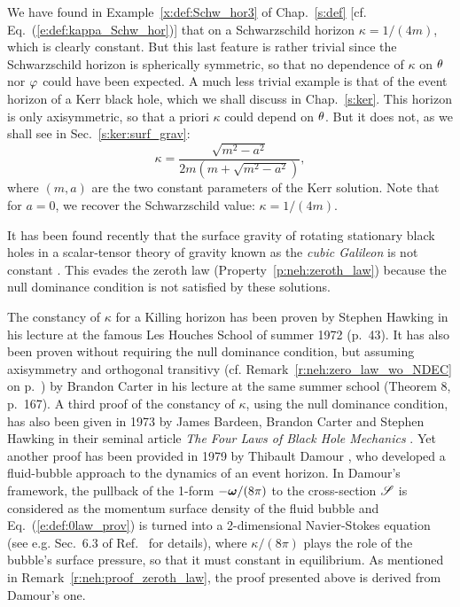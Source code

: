 \begin{example}
\label{x:neh:Schw_Kerr_kappa}
We have found in Example~\ref{x:def:Schw_hor3} of Chap.~\ref{s:def} [cf. Eq.~(\ref{e:def:kappa_Schw_hor})]
that on a Schwarzschild horizon $\kappa = 1/(4m)$,
which is clearly constant. But
this last feature is rather trivial since the Schwarzschild horizon is spherically
symmetric, so that no dependence of $\kappa$ on $\theta$ nor $\varphi$ could have been expected.
A much less trivial example is that of the event horizon of a Kerr black hole,
which we shall discuss in Chap.~\ref{s:ker}. This horizon is only axisymmetric,
so that a priori $\kappa$ could depend on $\theta$. But it does not, as we shall
see in Sec.~\ref{s:ker:surf_grav}:
\[
    \kappa = \frac{\sqrt{m^2 - a^2}}{2m(m + \sqrt{m^2-a^2})} ,
\]
where $(m,a)$ are the two constant parameters of the Kerr solution. Note that for $a=0$,
we recover the Schwarzschild value: $\kappa= 1/(4m)$.
\end{example}

\begin{example}
It has been found recently that the surface gravity of rotating stationary black holes
in a scalar-tensor theory of gravity known as the \emph{cubic Galileon}
is not constant \cite{Grand24}.
This evades the zeroth law (Property~\ref{p:neh:zeroth_law})
because the null dominance condition is not satisfied by these solutions.
\end{example}

\begin{hist}
The constancy of $\kappa$ for a Killing horizon has been proven by Stephen Hawking
in his lecture at the famous Les Houches School of summer 1972 \cite{Hawki73} (p.~43).
It has also been proven without requiring the null dominance condition, but
assuming axisymmetry and orthogonal transitivy (cf. Remark~\ref{r:neh:zero_law_wo_NDEC} on p.~\pageref{r:neh:zero_law_wo_NDEC}) by Brandon Carter in his lecture at the same summer
school
\cite{Carte73b} (Theorem 8, p.~167).
A third proof of the constancy of $\kappa$, using the null dominance condition,
has also been given in 1973 by James Bardeen, Brandon Carter and
Stephen Hawking
in their seminal article \emph{The Four Laws of Black Hole Mechanics}
\cite{BardeCH73}. Yet another proof has been provided in 1979 by Thibault Damour
\cite{Damou79,Damou82}, who developed a fluid-bubble approach to the dynamics of an event horizon.
In Damour's framework, the pullback of the 1-form  $-\bm{\omega}/(8\pi)$ to the cross-section
$\mathscr{S}$ is considered as the momentum surface density of the fluid bubble and Eq.~(\ref{e:def:0law_prov})
is turned into a 2-dimensional Navier-Stokes equation (see e.g. Sec.~6.3 of Ref.~\cite{GourgJ06} for details), where $\kappa/(8\pi)$ plays the role of the
bubble's surface pressure, so that it must constant in equilibrium. As mentioned in Remark~\ref{r:neh:proof_zeroth_law},
the proof presented above is derived from Damour's one.
\end{hist}

